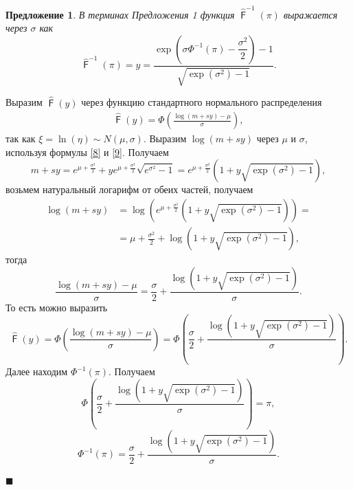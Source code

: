 \documentclass[12pt]{article}
\newtheorem{proposition}[theorem]{Предложение}
\newenvironment{Proof}{\par\noindent{\bf Доказательство.}}{\hfill$\scriptstyle\blacksquare$}
\DeclareMathOperator{\F}{\mathsf{F}}
\begin{document}
\begin{proposition}\label{pr4}
	В терминах Предложения 1 функция $\hat{\F}^{-1}(\pi)$ выражается через $\sigma$ как
	\begin{equation}
		\displaystyle{\hat{\F}^{-1}(\pi) = y = \frac{\exp\left( \sigma\Phi^{-1}(\pi) - \dfrac{\sigma^{2} }{2}\right) -1}{\sqrt{\exp(\sigma ^{2})-1}}}. \label{15}
	\end{equation}
\end{proposition}
\begin{Proof}
	Выразим $\hat{\F}(y)$ через функцию стандартного нормального распределения 
	\begin{align*}
		\hat{\F}(y)=\Phi \left(\frac{\log(m+sy) - \mu}{\sigma}\right),
	\end{align*}
 	так как $\xi=\ln(\eta) \sim N(\mu, \sigma).$
	Выразим $\log(m+sy)$ через $\mu$ и $\sigma$, используя формулы \eqref{8} и \eqref{9}. Получаем 
	\begin{equation*}
		m+sy = e^{\mu +\frac{\sigma ^{2}}{2}} + ye^{\mu +\frac{\sigma ^{2}}{2}}\sqrt{e^{\sigma ^{2}}-1} = e^{\mu +\frac{\sigma ^{2}}{2}}(1+y\sqrt{\exp(\sigma ^{2})-1}),
	\end{equation*}
	возьмем натуральный логарифм от обеих частей, получаем
	\begin{align*}
		\log(m+sy) &= \log(e^{\mu +\frac{\sigma ^{2}}{2}}(1+y\sqrt{\exp(\sigma ^{2})-1})) =\\
		&=\mu +\frac{\sigma ^{2}}{2} + \log(1+y\sqrt{\exp(\sigma ^{2})-1}),
	\end{align*}
	тогда
	\begin{equation*}
		\displaystyle{\frac{\log(m+sy)-\mu }{\sigma } = \frac{\sigma }{2} + \frac{\log(1+y\sqrt{\exp(\sigma ^{2})-1})}{\sigma}}.
	\end{equation*}
	То есть можно выразить
	\begin{equation*}
		\displaystyle{\hat{\F}(y) = \Phi \left(\frac{\log(m+sy)-\mu }{\sigma }\right) = \Phi \left(\frac{\sigma }{2} + \frac{\log(1+y\sqrt{\exp(\sigma ^{2})-1})}{\sigma}\right)}.
	\end{equation*}
	Далее находим $\Phi^{-1}(\pi)$. Получаем 
	\begin{equation*}
		\displaystyle{\Phi \left(\frac{\sigma }{2} + \frac{\log(1+y\sqrt{\exp(\sigma ^{2})-1})}{\sigma }\right) = \pi},
	\end{equation*}
	\begin{equation*}
		\displaystyle{\Phi^{-1}(\pi)=\frac{\sigma }{2} + \frac{\log(1+y\sqrt{\exp(\sigma ^{2})-1})}{\sigma}}.
	\end{equation*}

\end{Proof}
\end{document}
